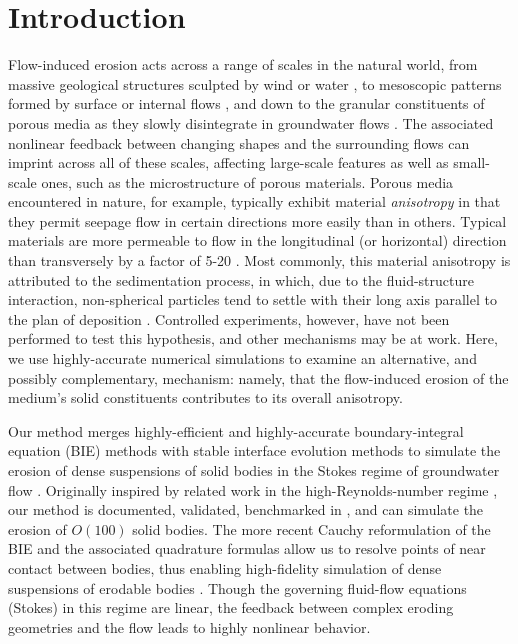 \documentclass[3p]{elsarticle}
\begin{document}


\section{Introduction}

Flow-induced erosion acts across a range of scales in the natural world, from massive geological structures sculpted by wind or water \cite{abrams2009growth, perkins2015amplification, mac2020ultra, sharma2022alcove, mac2022morphological}, to mesoscopic patterns formed by surface or internal flows \cite{berhanu2012shape, bertagni2021hydrodynamic}, and down to the granular constituents of porous media as they slowly disintegrate in groundwater flows \cite{zareei2022temporal}. The associated nonlinear feedback between changing shapes and the surrounding flows can imprint across all of these scales, affecting large-scale features as well as small-scale ones, such as the microstructure of porous materials. Porous media encountered in nature, for example, typically exhibit material {\em anisotropy} in that they permit seepage flow in certain directions more easily than in others. Typical materials are more permeable to flow in the longitudinal (or horizontal) direction than transversely by a factor of 5-20 \cite{bear1988dynamics, anderson2015applied}. Most commonly, this material anisotropy is attributed to the sedimentation process, in which, due to the fluid-structure interaction, non-spherical particles tend to settle with their long axis parallel to the plan of deposition \cite{bear1988dynamics}. Controlled experiments, however, have not been performed to test this hypothesis, and other mechanisms may be at work. Here, we use highly-accurate numerical simulations to examine an alternative, and possibly complementary, mechanism: namely, that the flow-induced erosion of the medium's solid constituents contributes to its overall anisotropy.

Our method merges highly-efficient and highly-accurate boundary-integral equation (BIE) methods with stable interface evolution methods to simulate the erosion of dense suspensions of solid bodies in the Stokes regime of groundwater flow \cite{quaife2018boundary}. Originally inspired by related work in the high-Reynolds-number regime \cite{Ristroph2012, Moore2013, Huang2015, MooreCPAM2017}, our method is documented, validated, benchmarked in \cite{quaife2018boundary}, and can simulate the erosion of $O(100)$ solid bodies. The more recent Cauchy reformulation of the BIE and the associated  quadrature formulas allow us to resolve points of near contact between bodies, thus enabling high-fidelity simulation of dense suspensions of erodable bodies \cite{chiu2020viscous}. Though the governing fluid-flow equations (Stokes) in this regime are linear, the feedback between complex eroding geometries and the flow leads to highly nonlinear behavior.
\end{document}
